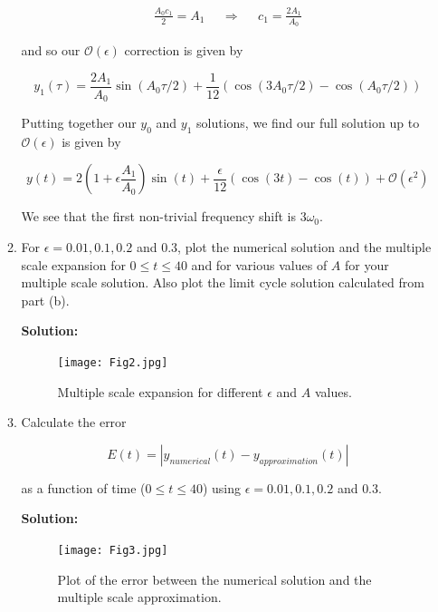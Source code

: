 \documentclass[12pt, a4paper]{article}
\begin{document}
\begin{enumerate}
\begin{enumerate}
    \begin{align*}
        \frac{A_0 c_1}{2} = A_1 && \Rightarrow && c_1 = \frac{2 A_1}{A_0}
    \end{align*}

    and so our $\mathcal{O}(\epsilon)$ correction is given by 

    $$y_1(\tau) = \frac{2A_1}{A_0} \sin(A_0 \tau/2) + \frac{1}{12} (\cos(3A_0 \tau/2) - \cos(A_0 \tau/2))$$

    Putting together our $y_0$ and $y_1$ solutions, we find our full solution up to $\mathcal{O}(\epsilon)$ is given by

    $$y(t) = 2\left(1+ \epsilon \frac{A_1}{A_0} \right) \sin (t) + \frac{\epsilon}{12} (\cos(3t) - \cos(t)) + \mathcal{O}(\epsilon^2)$$

    We see that the first non-trivial frequency shift is $3\omega_0$.

    \item For $\epsilon = 0.01,0.1,0.2$ and $0.3$, plot the numerical solution and the multiple scale expansion for $0 \le t \le 40$ and for various values of $A$ for your multiple scale solution. Also plot the limit cycle solution calculated from part (b).

    \textbf{Solution:}

    \begin{figure}[H]
    \centering
    \texttt{[image: Fig2.jpg]}
    \caption{Multiple scale expansion for different $\epsilon$ and $A$ values.}
\end{figure}

    \item Calculate the error 

    $$E(t) = |y_{numerical}(t)-y_{approximation}(t)|$$

    as a function of time ($0 \le t \le 40$) using $\epsilon = 0.01, 0.1, 0.2$ and $0.3$.

    \textbf{Solution:}
    \begin{figure}[H]
    \centering
    \texttt{[image: Fig3.jpg]}
    \caption{Plot of the error between the numerical solution and the multiple scale approximation.}
\end{figure}
 \end{enumerate}

\end{enumerate}
\end{document}

